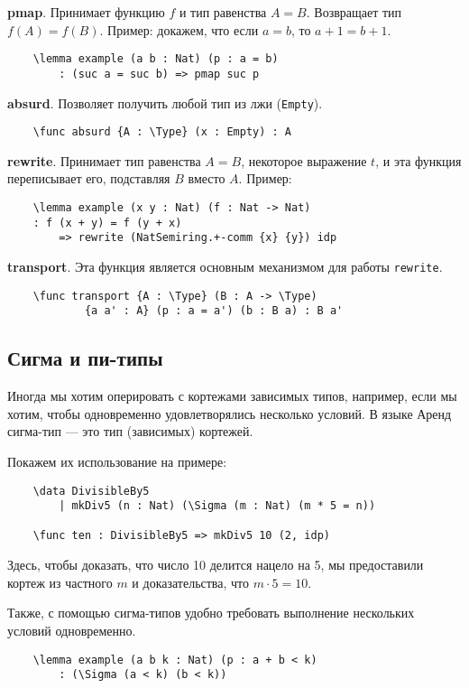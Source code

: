 \textbf{pmap}. Принимает функцию $f$ и тип равенства $A = B$. Возвращает тип $f(A) = f(B)$.
Пример: докажем, что если $a = b$, то $a+1 = b+1$.
\begin{verbatim}
    \lemma example (a b : Nat) (p : a = b) 
        : (suc a = suc b) => pmap suc p
\end{verbatim}

\textbf{absurd}. Позволяет получить любой тип из лжи (\texttt{Empty}).
\begin{verbatim}
    \func absurd {A : \Type} (x : Empty) : A
\end{verbatim}

\textbf{rewrite}. Принимает тип равенства $A = B$, некоторое выражение $t$, и эта функция переписывает его, подставляя $B$ вместо $A$.
Пример:
\begin{verbatim}
    \lemma example (x y : Nat) (f : Nat -> Nat)
    : f (x + y) = f (y + x)
        => rewrite (NatSemiring.+-comm {x} {y}) idp
\end{verbatim}

\textbf{transport}. Эта функция является основным механизмом для работы \texttt{rewrite}.
\begin{verbatim}
    \func transport {A : \Type} (B : A -> \Type)
            {a a' : A} (p : a = a') (b : B a) : B a'
\end{verbatim}

\subsection{Сигма и пи-типы}
Иногда мы хотим оперировать с кортежами зависимых типов, например, если мы хотим,
чтобы одновременно удовлетворялись несколько условий. В языке Аренд сигма-тип --- это тип (зависимых) кортежей.

Покажем их использование на примере:
\begin{verbatim}
    \data DivisibleBy5
        | mkDiv5 (n : Nat) (\Sigma (m : Nat) (m * 5 = n))

    \func ten : DivisibleBy5 => mkDiv5 10 (2, idp)
\end{verbatim}

Здесь, чтобы доказать, что число 10 делится нацело на 5, мы предоставили кортеж из частного $m$ и доказательства, что $m \cdot 5 = 10$.

Также, с помощью сигма-типов удобно требовать выполнение нескольких условий одновременно.
\begin{verbatim}
    \lemma example (a b k : Nat) (p : a + b < k)
        : (\Sigma (a < k) (b < k))
\end{verbatim}

